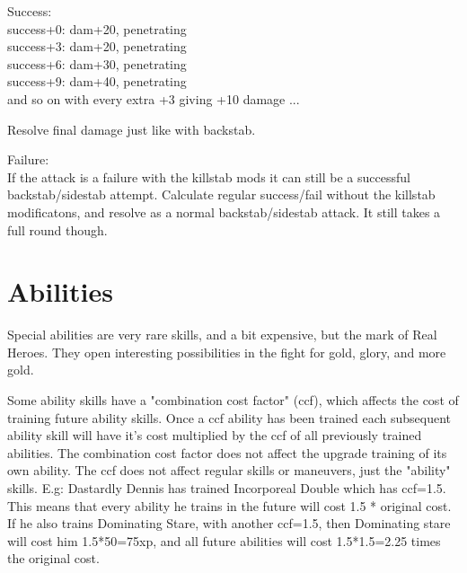\noindent Success:\\
success+0: dam+20, penetrating\\
success+3: dam+20, penetrating\\
success+6: dam+30, penetrating\\
success+9: dam+40, penetrating\\
and so on with every extra +3 giving +10 damage ...

Resolve final damage just like with backstab.

\noindent Failure:\\
If the attack is a failure with the killstab mods it can still be a successful backstab/sidestab attempt. Calculate regular success/fail without the killstab modificatons, and resolve as a normal backstab/sidestab attack. It still takes a full round though.


\closeskillslist















\section*{Abilities}

Special abilities are very rare skills, and a bit expensive, but the mark of Real Heroes. They open interesting possibilities in the fight for gold, glory, and more gold.

Some ability skills have a "combination cost factor" (ccf), which affects the cost of training future ability skills. Once a ccf ability has been trained each subsequent ability skill will have it's cost multiplied by the ccf of all previously trained abilities. The combination cost factor does not affect the upgrade training of its own ability. The ccf does not affect regular skills or maneuvers, just the "ability" skills. 
E.g: Dastardly Dennis has trained Incorporeal Double which has ccf=1.5. This means that every ability he trains in the future will cost 1.5 * original cost. If he also trains Dominating Stare, with another ccf=1.5, then Dominating stare will cost him 1.5*50=75xp, and all future abilities will cost 1.5*1.5=2.25 times the original cost.

